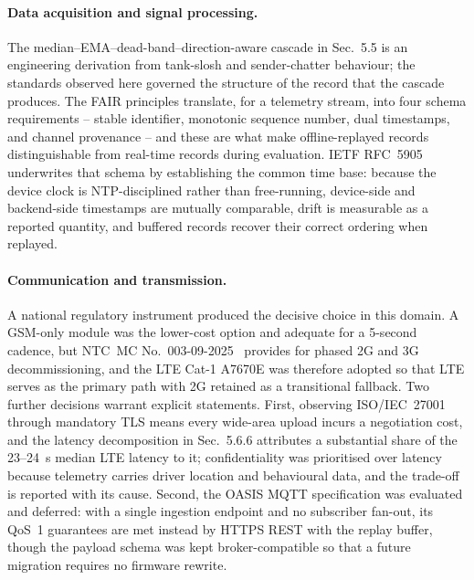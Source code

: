 \paragraph{Data acquisition and signal processing.} The median--EMA--dead-band--direction-aware cascade in Sec.~5.5 is an engineering derivation from tank-slosh and sender-chatter behaviour; the standards observed here governed the structure of the record that the cascade produces. The FAIR principles translate, for a telemetry stream, into four schema requirements -- stable identifier, monotonic sequence number, dual timestamps, and channel provenance -- and these are what make offline-replayed records distinguishable from real-time records during evaluation. IETF RFC~5905 underwrites that schema by establishing the common time base: because the device clock is NTP-disciplined rather than free-running, device-side and backend-side timestamps are mutually comparable, drift is measurable as a reported quantity, and buffered records recover their correct ordering when replayed.

\paragraph{Communication and transmission.} A national regulatory instrument produced the decisive choice in this domain. A GSM-only module was the lower-cost option and adequate for a 5-second cadence, but NTC~MC No.~003-09-2025~\cite{ntc2025legacy_network_phaseout} provides for phased 2G and 3G decommissioning, and the LTE Cat-1 A7670E was therefore adopted so that LTE serves as the primary path with 2G retained as a transitional fallback. Two further decisions warrant explicit statements. First, observing ISO/IEC~27001~\cite{iso27001} through mandatory TLS means every wide-area upload incurs a negotiation cost, and the latency decomposition in Sec.~5.6.6 attributes a substantial share of the 23--24~s median LTE latency to it; confidentiality was prioritised over latency because telemetry carries driver location and behavioural data, and the trade-off is reported with its cause. Second, the OASIS MQTT specification was evaluated and deferred: with a single ingestion endpoint and no subscriber fan-out, its QoS~1 guarantees are met instead by HTTPS REST with the replay buffer, though the payload schema was kept broker-compatible so that a future migration requires no firmware rewrite.

